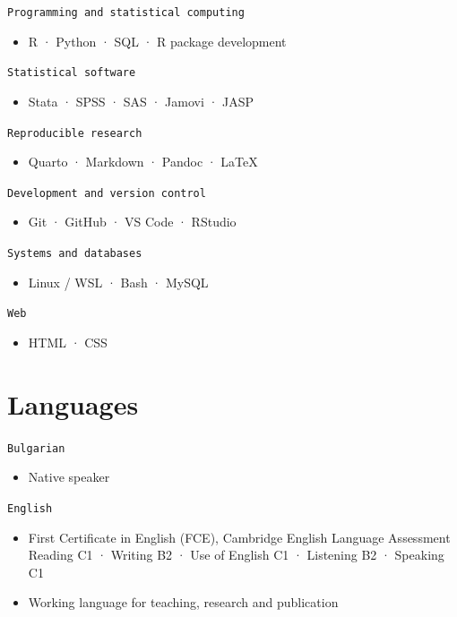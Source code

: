 \documentclass[
  10.5pt,
  a4paper,
  DIV=11,
  numbers=noendperiod]{scrartcl}
\providecommand{\tightlist}{%
  \setlength{\itemsep}{0pt}\setlength{\parskip}{0pt}}
\let\oldtexttt\texttt
\renewcommand{\texttt}[1]{{\color{cvbronze}\small\oldtexttt{#1}}}
\begin{document}
\texttt{Programming\ and\ statistical\ computing}

\begin{itemize}
\tightlist
\item
  R · Python · SQL · R package development
\end{itemize}

\texttt{Statistical\ software}

\begin{itemize}
\tightlist
\item
  Stata · SPSS · SAS · Jamovi · JASP
\end{itemize}

\texttt{Reproducible\ research}

\begin{itemize}
\tightlist
\item
  Quarto · Markdown · Pandoc · LaTeX
\end{itemize}

\texttt{Development\ and\ version\ control}

\begin{itemize}
\tightlist
\item
  Git · GitHub · VS Code · RStudio
\end{itemize}

\texttt{Systems\ and\ databases}

\begin{itemize}
\tightlist
\item
  Linux / WSL · Bash · MySQL
\end{itemize}

\texttt{Web}

\begin{itemize}
\tightlist
\item
  HTML · CSS
\end{itemize}

\section{Languages}\label{languages}

\texttt{Bulgarian}

\begin{itemize}
\tightlist
\item
  Native speaker
\end{itemize}

\texttt{English}

\begin{itemize}
\tightlist
\item
  First Certificate in English (FCE), Cambridge English Language
  Assessment \textbar{} Reading C1 · Writing B2 · Use of English C1 ·
  Listening B2 · Speaking C1
\item
  Working language for teaching, research and publication
\end{itemize}
\end{document}
